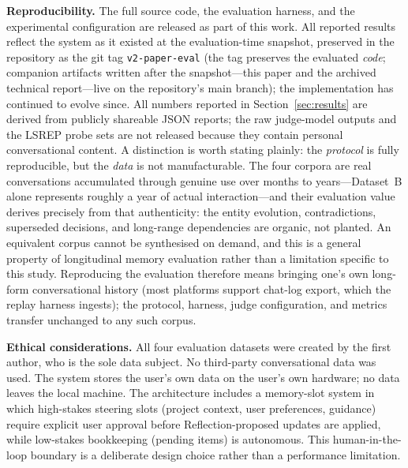 \documentclass[10pt]{article}
\begin{document}
\textbf{Reproducibility.} The full source code, the evaluation harness, and the experimental configuration are released as part of this work. All reported results reflect the system as it existed at the evaluation-time snapshot, preserved in the repository as the git tag \texttt{v2-paper-eval} (the tag preserves the evaluated \emph{code}; companion artifacts written after the snapshot---this paper and the archived technical report---live on the repository's main branch); the implementation has continued to evolve since. All numbers reported in Section~\ref{sec:results} are derived from publicly shareable JSON reports; the raw judge-model outputs and the LSREP probe sets are not released because they contain personal conversational content. A distinction is worth stating plainly: the \emph{protocol} is fully reproducible, but the \emph{data} is not manufacturable. The four corpora are real conversations accumulated through genuine use over months to years---Dataset~B alone represents roughly a year of actual interaction---and their evaluation value derives precisely from that authenticity: the entity evolution, contradictions, superseded decisions, and long-range dependencies are organic, not planted. An equivalent corpus cannot be synthesised on demand, and this is a general property of longitudinal memory evaluation rather than a limitation specific to this study. Reproducing the evaluation therefore means bringing one's own long-form conversational history (most platforms support chat-log export, which the replay harness ingests); the protocol, harness, judge configuration, and metrics transfer unchanged to any such corpus.

\textbf{Ethical considerations.} All four evaluation datasets were created by the first author, who is the sole data subject. No third-party conversational data was used. The system stores the user's own data on the user's own hardware; no data leaves the local machine. The architecture includes a memory-slot system in which high-stakes steering slots (project context, user preferences, guidance) require explicit user approval before Reflection-proposed updates are applied, while low-stakes bookkeeping (pending items) is autonomous. This human-in-the-loop boundary is a deliberate design choice rather than a performance limitation.
\end{document}
